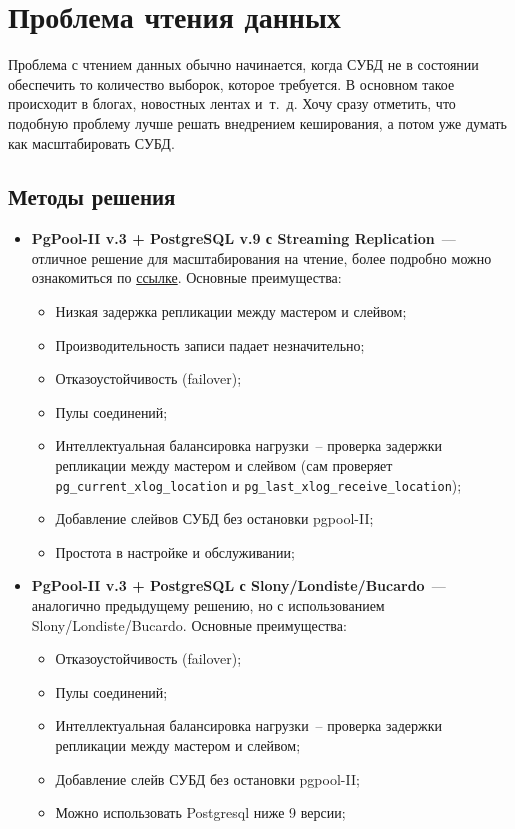 \section{Проблема чтения данных}

Проблема с чтением данных обычно начинается, когда СУБД не в состоянии обеспечить то количество выборок, которое требуется. В основном такое происходит в блогах, новостных лентах и~т.~д. Хочу сразу отметить, что подобную проблему лучше решать внедрением кеширования, а потом уже думать как масштабировать СУБД.

\subsection{Методы решения}

\begin{itemize}
  \item \textbf{PgPool-II v.3 + PostgreSQL v.9 с Streaming Replication}~--- отличное решение для масштабирования на чтение, более подробно можно ознакомиться по \href{http://pgpool.projects.pgfoundry.org/contrib\_docs/simple\_sr\_setting/index.html}{ссылке}. Основные преимущества:

  \begin{itemize}
    \item Низкая задержка репликации между мастером и слейвом;
    \item Производительность записи падает незначительно;
    \item Отказоустойчивость (failover);
    \item Пулы соединений;
    \item Интеллектуальная балансировка нагрузки~-- проверка задержки репликации между мастером и слейвом (сам проверяет \lstinline!pg_current_xlog_location! и \lstinline!pg_last_xlog_receive_location!);
    \item Добавление слейвов СУБД без остановки pgpool-II;
    \item Простота в настройке и обслуживании;
  \end{itemize}

  \item \textbf{PgPool-II v.3 + PostgreSQL с Slony/Londiste/Bucardo}~--- аналогично предыдущему решению, но с использованием Slony/Londiste/Bucardo. Основные преимущества:

  \begin{itemize}
    \item Отказоустойчивость (failover);
    \item Пулы соединений;
    \item Интеллектуальная балансировка нагрузки~-- проверка задержки репликации между мастером и слейвом;
    \item Добавление слейв СУБД без остановки pgpool-II;
    \item Можно использовать Postgresql ниже 9 версии;
  \end{itemize}


\end{itemize}
